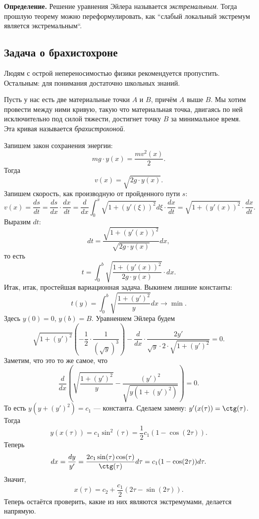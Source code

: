 \textbf{Определение.} Решение уравнения Эйлера называется \textit{экстремальным}.
Тогда прошлую теорему можно переформулировать, как ``слабый локальный экстремум является экстремальным``.

\subsection{Задача о брахистохроне}
Людям с острой непереносимостью физики рекомендуется пропустить.
Остальным: для понимания достаточно школьных знаний.

Пусть у нас есть две материальные точки $A$ и $B$, причём $A$ выше $B$.
Мы хотим провести между ними кривую, такую что материальная точка, двигаясь по ней исключительно под силой тяжести, достигнет точку $B$ за минимальное время.
Эта кривая называется \textit{брахистрохоной}.

\begin{figure}[ht]
    \centering
\end{figure}

Запишем закон сохранения энергии:
\[
    mg \cdot y(x) = \frac{m v^2(x)}{2}.
\]
Тогда
\[
    v(x) = \sqrt {2g \cdot y(x)}.
\]
Запишем скорость, как производную от пройденного пути $s$:
\[
    v(x) = \frac{ds}{dt} = \frac{ds}{dx} \cdot \frac{dx}{dt} = \frac{d}{dx} \int_0^x \sqrt{ 1 + (y'(\xi))^2 } d\xi \cdot \frac{dx}{dt} = \sqrt{1 + (y'(x))^2} \cdot \frac{dx}{dt}.
\]
Выразим $dt$:
\[
    dt = \frac{\sqrt{1 + (y'(x))^2}}{\sqrt{2g \cdot y(x)}} dx,
\]
то есть
\[
    t = \int_0^b \sqrt{ \frac{1 + (y'(x))^2}{2g \cdot y(x)}} \cdot dx.
\]
Итак, итак, простейшая вариационная задача.
Выкинем лишние константы:
\[
    t(y) = \int_0^b \sqrt{ \frac{1 + (y')^2}{y}} dx \to \min.
\]
Здесь $y(0) = 0$, $y(b) = B$.
Уравнением Эйлера будем
\[
    \sqrt{1 + (y')^2} \left( -\frac{1}{2} \cdot \frac{1}{(\sqrt y)^3} \right) - \frac{d}{dx} \cdot \frac{2y'}{\sqrt y \cdot 2 \cdot \sqrt{1 + (y')^2}} = 0.
\]
Заметим, что это то же самое, что
\[
    \frac{d}{dx} \left( \sqrt{\frac{1 + (y')^2}{y}} - \frac{(y')^2}{\sqrt{y (1 + (y')^2)}} \right) = 0.
\]
То есть $y(y + (y')^2) = c_1$ --- константа.
Сделаем замену: $y'(x(\tau)) = \ctg(\tau)$.
Тогда 
\[
    y(x(\tau)) = c_1 \sin^2(\tau) = \frac{1}{2} c_1 (1 - \cos(2\tau)).
\]
Теперь
\[
    dx = \frac{dy}{y'} = \frac{2c_1 \sin(\tau) \cos(\tau)}{\ctg(\tau)} d\tau = c_1(1 - \cos(2\tau)) d\tau.
\]
Значит,
\[
    x(\tau) = c_2 + \frac{c_1}{2} (2\tau - \sin(2\tau)).
\]
Теперь остаётся проверить, какие из них являются экстремумами, делается напрямую.

